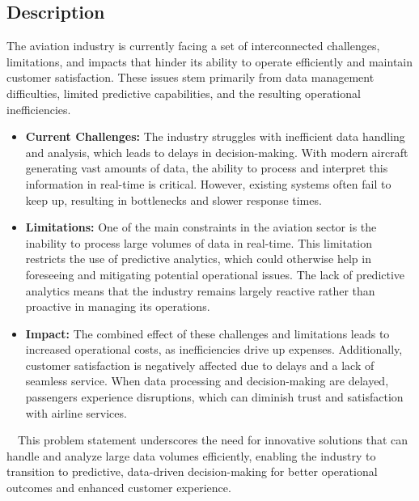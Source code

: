 \documentclass[12pt, a4paper]{article}
\begin{document}
\subsection{Description}
The aviation industry is currently facing a set of interconnected challenges,
limitations, and impacts that hinder its ability to operate efficiently and
maintain customer satisfaction. These issues stem primarily from data management
difficulties, limited predictive capabilities, and the resulting operational
inefficiencies.
    \begin{itemize}
        \item \textbf{Current Challenges:} The industry struggles with
        inefficient data handling and analysis, which leads to delays in
        decision-making. With modern aircraft generating vast amounts of data,
        the ability to process and interpret this information in real-time is
        critical. However, existing systems often fail to keep up, resulting in
        bottlenecks and slower response times.
        \item \textbf{Limitations:} One of the main constraints in the aviation
        sector is the inability to process large volumes of data in real-time.
        This limitation restricts the use of predictive analytics, which could
        otherwise help in foreseeing and mitigating potential operational
        issues. The lack of predictive analytics means that the industry remains
        largely reactive rather than proactive in managing its operations.
        \item \textbf{Impact:} The combined effect of these challenges and
        limitations leads to increased operational costs, as inefficiencies
        drive up expenses. Additionally, customer satisfaction is negatively
        affected due to delays and a lack of seamless service. When data
        processing and decision-making are delayed, passengers experience
        disruptions, which can diminish trust and satisfaction with airline
        services.
    
    \end{itemize}
    $\quad$This problem statement underscores the need for innovative solutions
    that can handle and analyze large data volumes efficiently, enabling the
    industry to transition to predictive, data-driven decision-making for better
    operational outcomes and enhanced customer experience.
\end{document}
